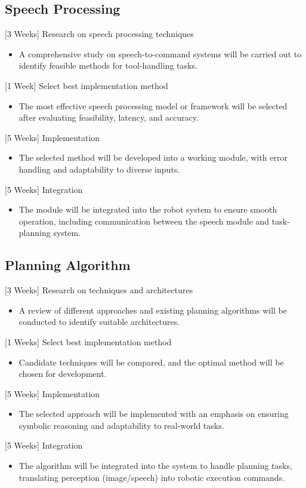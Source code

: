 \documentclass[12pt]{extarticle}
\begin{document}
\subsection{Speech Processing}
[3 Weeks] Research on speech processing techniques
\begin{itemize}
    \item A comprehensive study on speech-to-command systems will be carried out to identify feasible methods for tool-handling tasks.
\end{itemize}
[1 Week] Select best implementation method
\begin{itemize}
    \item The most effective speech processing model or framework will be selected after evaluating feasibility, latency, and accuracy.
\end{itemize}
[5 Weeks] Implementation
\begin{itemize}
    \item The selected method will be developed into a working module, with error handling and adaptability to diverse inputs.
\end{itemize}
[5 Weeks] Integration
\begin{itemize}
    \item The module will be integrated into the robot system to ensure smooth operation, including communication between the speech module and task-planning system.
\end{itemize}
\subsection{Planning Algorithm}
[3 Weeks] Research on techniques and architectures
\begin{itemize}
    \item A review of different approaches and existing planning algorithms will be conducted to identify suitable architectures.
\end{itemize}
[1 Weeks] Select best implementation method
\begin{itemize}
    \item Candidate techniques will be compared, and the optimal method will be chosen for development.
\end{itemize}
[5 Weeks] Implementation
\begin{itemize}
    \item The selected approach will be implemented with an emphasis on ensuring symbolic reasoning and adaptability to real-world tasks.
\end{itemize}
[5 Weeks] Integration
\begin{itemize}
    \item The algorithm will be integrated into the system to handle planning tasks, translating perception (image/speech) into robotic execution commands.
\end{itemize}
\end{document}
